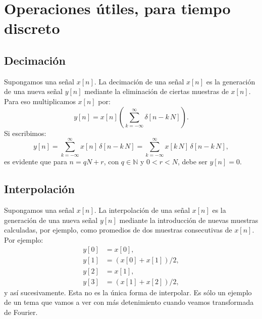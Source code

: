 \section{Operaciones útiles, para tiempo discreto}


\subsection{Decimación}

Supongamos una señal $x[n]$. La decimación de una señal $x[n]$ es la generación de una nueva señal $y[n]$ mediante la eliminación de ciertas muestras de $x[n]$. Para eso multiplicamos $x[n]$ por:
\begin{equation}
	y[n] = x[n] \left( \sum_{k=-\infty}^{\infty} \delta[n - k \, N] \right).
\end{equation}
Si escribimos:
\begin{equation}
	y[n] = \sum_{k=-\infty}^{\infty} x[n] \, \delta[n - k \, N] =
	\sum_{k=-\infty}^{\infty} x[k \, N] \, \delta[n - k \, N],
\end{equation}
es evidente que para $n = qN + r$, con $q \in \mathbb{N}$ y $0 < r < N$, debe ser $y[n] = 0$.

\subsection{Interpolación}

Supongamos una señal $x[n]$. La interpolación de una señal $x[n]$ es la generación de una nueva señal $y[n]$ mediante la introducción de nuevas muestras 
calculadas, por ejemplo, como promedios de dos muestras consecutivas de $x[n]$. Por ejemplo:
\begin{align}
	y[0] &= x[0], \\
	y[1] &= (x[0] + x[1]) / 2, \\
	y[2] &= x[1], \\
	y[3] &= (x[1] + x[2]) / 2,
\end{align}
y así sucesivamente. Esta no es la única forma de interpolar. Es sólo un ejemplo de un tema que vamos a ver con más detenimiento cuando veamos transformada de Fourier.
